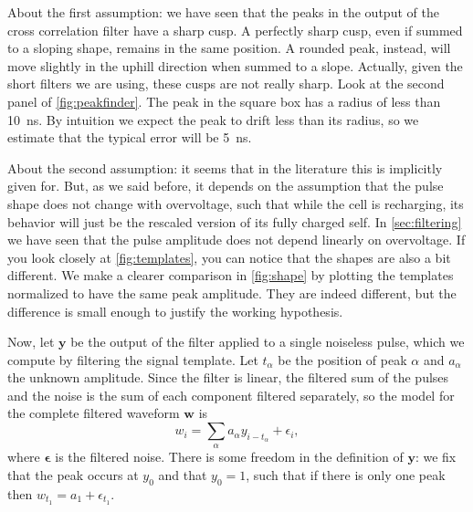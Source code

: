About the first assumption: we have seen that the peaks in the output of the
cross correlation filter have a sharp cusp. A perfectly sharp cusp, even if
summed to a sloping shape, remains in the same position. A rounded peak,
instead, will move slightly in the uphill direction when summed to a slope.
Actually, given the short filters we are using, these cusps are not really
sharp. Look at the second panel of \autoref{fig:peakfinder}. The peak in the
square box has a radius of less than \SI{10}{ns}. By intuition we expect the
peak to drift less than its radius, so we estimate that the typical error will
be \SI{5}{ns}.

About the second assumption: it seems that in the literature this is implicitly
given for. But, as we said before, it depends on the assumption that the pulse
shape does not change with overvoltage, such that while the cell is recharging,
its behavior will just be the rescaled version of its fully charged self. In
\autoref{sec:filtering} we have seen that the pulse amplitude does not depend
linearly on overvoltage. If you look closely at \autoref{fig:templates}, you
can notice that the shapes are also a bit different. We make a clearer
comparison in \autoref{fig:shape} by plotting the templates normalized to have
the same peak amplitude. They are indeed different, but the difference is small
enough to justify the working hypothesis.

\begin{figure}
    

    
\end{figure}

Now, let $\mathbf y$ be the output of the filter applied to a single noiseless
pulse, which we compute by filtering the signal template. Let $t_\alpha$ be the
position of peak $\alpha$ and $a_\alpha$ the unknown amplitude. Since the
filter is linear, the filtered sum of the pulses and the noise is the sum of
each component filtered separately, so the model for the complete filtered
waveform $\mathbf w$ is
%
\begin{equation}
    w_i = \sum_\alpha a_\alpha y_{i - t_\alpha} + \epsilon_i,
\end{equation}
%
where $\boldsymbol\epsilon$ is the filtered noise. There is some freedom in the
definition of $\mathbf y$: we fix that the peak occurs at $y_0$ and that $y_0 =
1$, such that if there is only one peak then $w_{t_1} = a_1 + \epsilon_{t_1}$.

